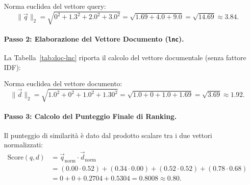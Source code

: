 Norma euclidea del vettore query:
\begin{equation}
\|\vec{q}\|_2 = \sqrt{0^2 + 1.3^2 + 2.0^2 + 3.0^2} = \sqrt{1.69 + 4.0 + 9.0} = \sqrt{14.69} \approx \mathbf{3.84}.
\end{equation}

\paragraph{Passo 2: Elaborazione del Vettore Documento (\texttt{lnc}).}
La Tabella~\ref{tab:doc-lnc} riporta il calcolo del vettore documentale (senza fattore IDF):

\begin{table}[H]
\centering
\small
{}
\caption{Computazione del vettore di documento secondo lo schema \texttt{lnc}.}
\label{tab:doc-lnc}
\end{table}

Norma euclidea del vettore documento:
\begin{equation}
\|\vec{d}\|_2 = \sqrt{1.0^2 + 0^2 + 1.0^2 + 1.30^2} = \sqrt{1.0 + 0 + 1.0 + 1.69} = \sqrt{3.69} \approx \mathbf{1.92}.
\end{equation}

\paragraph{Passo 3: Calcolo del Punteggio Finale di Ranking.}
Il punteggio di similarit\`a \`e dato dal prodotto scalare tra i due vettori normalizzati:
\begin{align}
\text{Score}(q, d) &= \vec{q}_{\text{norm}} \cdot \vec{d}_{\text{norm}} \nonumber \\
                   &= (0.00 \cdot 0.52) + (0.34 \cdot 0.00) + (0.52 \cdot 0.52) + (0.78 \cdot 0.68) \nonumber \\
                   &= 0 + 0 + 0.2704 + 0.5304 = \mathbf{0.8008} \approx \mathbf{0.80}.
\end{align}

